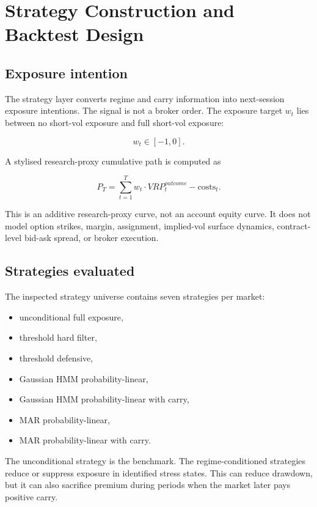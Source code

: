 \documentclass[11pt,a4paper]{article}
\begin{document}
\section{Strategy Construction and Backtest Design}

\subsection{Exposure intention}

The strategy layer converts regime and carry information into next-session exposure intentions. The signal is not a broker order. The exposure target $w_t$ lies between no short-vol exposure and full short-vol exposure:

\begin{equation}
w_t \in [-1,0].
\end{equation}

A stylised research-proxy cumulative path is computed as

\begin{equation}
P_T = \sum_{t=1}^{T} w_t \cdot VRP^{outcome}_t - \text{costs}_t.
\end{equation}

This is an additive research-proxy curve, not an account equity curve. It does not model option strikes, margin, assignment, implied-vol surface dynamics, contract-level bid-ask spread, or broker execution.

\subsection{Strategies evaluated}

The inspected strategy universe contains seven strategies per market:

\begin{itemize}
    \item unconditional full exposure,
    \item threshold hard filter,
    \item threshold defensive,
    \item Gaussian HMM probability-linear,
    \item Gaussian HMM probability-linear with carry,
    \item MAR probability-linear,
    \item MAR probability-linear with carry.
\end{itemize}

The unconditional strategy is the benchmark. The regime-conditioned strategies reduce or suppress exposure in identified stress states. This can reduce drawdown, but it can also sacrifice premium during periods when the market later pays positive carry.
\end{document}
